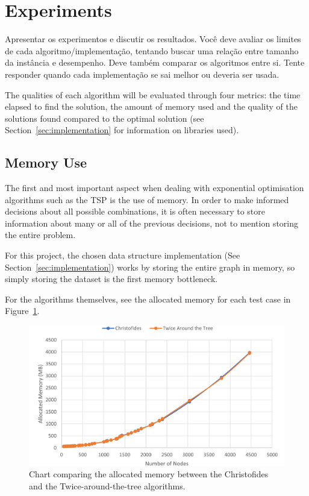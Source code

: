 \documentclass[12pt]{article}
\begin{document}
\section{Experiments} \label{sec:experiments}
    Apresentar os experimentos e discutir os resultados. Você deve avaliar os
    limites de cada algoritmo/implementação, tentando buscar uma relação entre
    tamanho da instância e desempenho. Deve também comparar os algoritmos
    entre si. Tente responder quando cada implementação se sai melhor ou
    deveria ser usada.

The qualities of each algorithm will be evaluated through four metrics: the time elapsed 
to find the solution, the amount of memory used and the quality of the solutions found 
compared to the optimal solution (see Section~\ref{sec:implementation} for information 
on libraries used).

\subsection{Memory Use} \label{sec:exp_memory}

The first and most important aspect when dealing with exponential optimisation algorithms such as 
the TSP is the use of memory. In order to make informed decisions about all possible combinations, 
it is often necessary to store information about many or all of the previous decisions, not to 
mention storing the entire problem.

For this project, the chosen data structure implementation (See Section~\ref{sec:implementation}) works by storing 
the entire graph in memory, so simply storing the dataset is the first memory bottleneck.

For the algorithms themselves, see the allocated memory for each test case in Figure~\ref{fig:mem_use}.

\begin{figure}[ht]
\centering
\includegraphics[height=.325\textheight]{memory_use_comparison.png}
\caption{Chart comparing the allocated memory between the Christofides and the Twice-around-the-tree algorithms.}
\label{fig:mem_use}
\end{figure}
\end{document}
